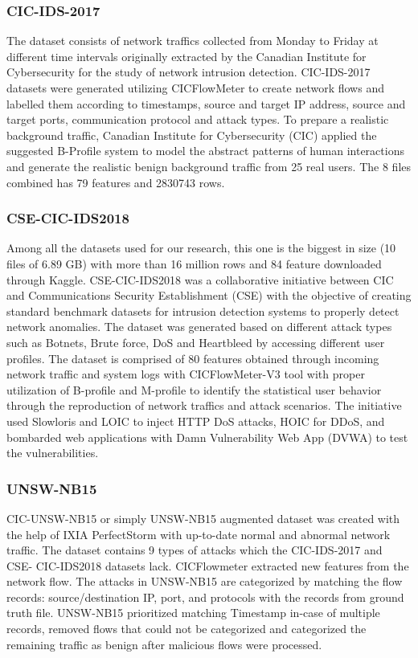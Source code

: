 \subsubsection{CIC-IDS-2017}
The dataset consists of network traffics collected from Monday to Friday at different time intervals originally extracted by the Canadian 
Institute for Cybersecurity for the study of network intrusion detection. CIC-IDS-2017 datasets were generated utilizing CICFlowMeter to 
create network flows and labelled them according to timestamps, source and target IP address, source and target ports, communication protocol 
and attack types. To prepare a realistic background traffic, Canadian Institute for Cybersecurity (CIC) applied the suggested B-Profile system \cite{Sharafaldin2018} 
to model the abstract patterns of human interactions and generate the realistic benign background traffic from 25 real users. 
The 8 files combined has 79 features and 2830743 rows.

\subsubsection{CSE-CIC-IDS2018}
Among all the datasets used for our research, this one is the biggest in size (10 files of 6.89 GB) with more than 16 million rows and 
84 feature downloaded through Kaggle. CSE-CIC-IDS2018 was a collaborative initiative between CIC and Communications Security Establishment 
(CSE) with the objective of creating standard benchmark datasets for intrusion detection systems to properly detect network anomalies. 
The dataset was generated based on different attack types such as Botnets, Brute force, DoS and Heartbleed by accessing different user 
profiles. The dataset is comprised of 80 features obtained through incoming network traffic and system logs with CICFlowMeter-V3 tool with 
proper utilization of B-profile and M-profile to identify the statistical user behavior through the reproduction of network traffics and 
attack scenarios. The initiative used Slowloris and LOIC to inject HTTP DoS attacks, HOIC for DDoS, and bombarded web applications with 
Damn Vulnerability Web App (DVWA) to test the vulnerabilities.


\subsubsection{UNSW-NB15}

CIC-UNSW-NB15 or simply UNSW-NB15 augmented dataset was created with the help of IXIA PerfectStorm with up-to-date normal and abnormal 
network traffic. The dataset contains 9 types of attacks which the CIC-IDS-2017 and CSE- CIC-IDS2018 datasets lack. CICFlowmeter extracted 
new features from the network flow. The attacks in UNSW-NB15 are categorized by matching the flow records: source/destination IP, port, and 
protocols with the records from ground truth file. UNSW-NB15 prioritized matching Timestamp in-case of multiple records, removed flows that 
could not be categorized and categorized the remaining traffic as benign after malicious flows were processed. 
\clearpage
